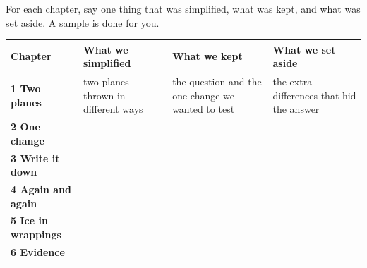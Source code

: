 \clearpage
\thispagestyle{fancy}
For each chapter, say one thing that was simplified, what was kept, and what was set aside. A sample is done for you.

\renewcommand{\arraystretch}{2.3}
\begin{center}\sffamily\scriptsize
\begin{tabularx}{\textwidth}{|>{\bfseries}p{2.1cm}|X|X|X|}
\hline
\textbf{Chapter} & \textbf{What we simplified} & \textbf{What we kept} & \textbf{What we set aside} \\ \hline
1 Two planes & two planes thrown in different ways & the question and the one change we wanted to test & the extra differences that hid the answer \\ \hline
2 One change & & & \\ \hline
3 Write it down & & & \\ \hline
4 Again and again & & & \\ \hline
5 Ice in wrappings & & & \\ \hline
6 Evidence & & & \\ \hline
\end{tabularx}
\end{center}

